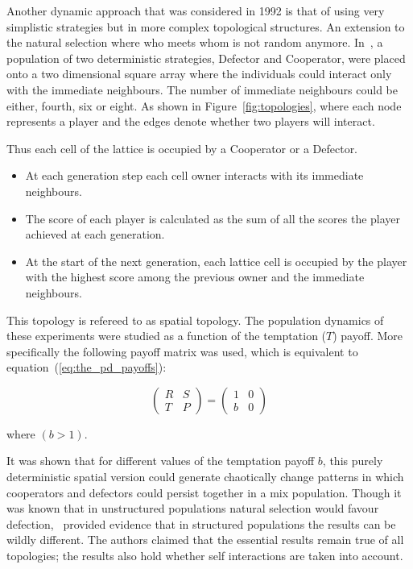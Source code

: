 \documentclass{article}
\theoremstyle{definition}
\begin{document}
Another dynamic approach that was considered in 1992 is that of using very simplistic
strategies but in more complex topological structures. An extension to the natural selection
where who meets whom is not random anymore. In~\cite{Nowak1992b}, a population
of two deterministic strategies, Defector and Cooperator, were placed onto a two
dimensional square array where the individuals could interact only with the immediate
neighbours. The number of immediate neighbours could be either, fourth, six or eight. As
shown in Figure~\ref{fig:topologies}, where each node represents a player and the
edges denote whether two players will interact.

Thus each cell of the lattice is occupied by a Cooperator or a Defector.
\begin{itemize}
    \item At each generation step each cell owner interacts with its immediate neighbours.
    \item The score of each player is calculated as the sum of all the scores the player
    achieved at each generation.
    \item At the start of the next generation, each lattice
    cell is occupied by the player with the highest score among the previous owner
    and the immediate neighbours.
\end{itemize}

This topology is refereed to as spatial topology. The population dynamics of these
experiments were studied as a function of the temptation (\(T\)) payoff.
More specifically the following payoff matrix was used, which is equivalent
to equation~(\ref{eq:the_pd_payoffs}):

\begin{equation}
    \begin{pmatrix}
    R & S \\ T & P
    \end{pmatrix}
    =
    \begin{pmatrix}
        1 & 0 \\ b & 0
    \end{pmatrix}
\end{equation}

where \((b>1)\).

It was shown that for different values of the temptation payoff \(b\), this purely
deterministic spatial version could generate chaotically change patterns in which
cooperators and defectors could persist together in a mix population. 
Though it was known that in unstructured populations natural selection would favour
defection,~\cite{Nowak1992} provided evidence that in structured populations
the results can be wildly different.
The authors claimed that the essential results remain true of all topologies; 
the results also hold whether self interactions are taken into account.
\end{document}
